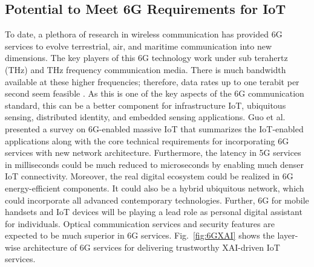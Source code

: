 \documentclass[journal]{IEEEtran}
\begin{document}
\subsection{Potential to Meet 6G Requirements for IoT}
To date, a plethora of research in wireless communication has provided 6G services to evolve terrestrial, air, and maritime communication into new dimensions. The key players of this 6G technology work under sub terahertz (THz) and THz frequency communication media. There is much bandwidth available at these higher frequencies; therefore, data rates up to one terabit per second seem feasible \cite{zhao2020comprehensive}. As this is one of the key aspects of the 6G communication standard, this can be a better component for infrastructure IoT, ubiquitous sensing, distributed identity, and embedded sensing applications. Guo et al. \cite{guo2021enabling} presented a survey on 6G-enabled massive IoT that summarizes the IoT-enabled applications along with the core technical requirements for incorporating 6G services with new network architecture. Furthermore, the latency in 5G services in milliseconds could be much reduced to microseconds by enabling much denser IoT connectivity. Moreover, the real digital ecosystem could be realized in 6G energy-efficient components. It could also be a hybrid ubiquitous network, which could incorporate all advanced contemporary technologies. Further, 6G for mobile handsets and IoT devices will be playing a lead role as personal digital assistant for individuals. Optical communication services and security features are expected to be much superior in 6G services. Fig.~\ref{fig:6GXAI} shows the layer-wise architecture of 6G services for delivering trustworthy XAI-driven IoT services.
\end{document}
